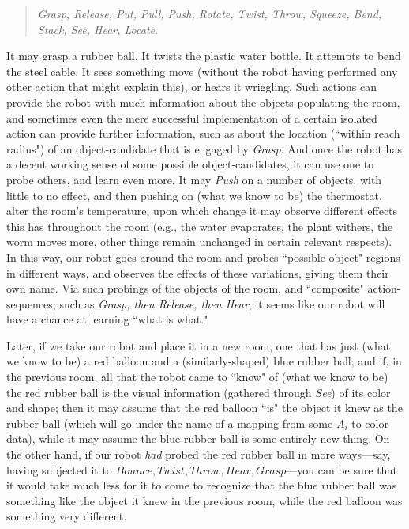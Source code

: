 \documentclass[11pt]{book}
\theoremstyle{definition}
\theoremstyle{definition}
\theoremstyle{definition}
\theoremstyle{theorem}
\theoremstyle{definition}
\begin{document}
\begin{quote}
	\textit{Grasp, Release, Put, Pull, Push, Rotate, Twist, Throw, Squeeze, Bend, Stack, See, Hear, Locate}.   
\end{quote}  
It may grasp a rubber ball. It twists the plastic water bottle. It attempts to bend the steel cable. It sees something move (without the robot having performed any other action that might explain this), or hears it wriggling. Such actions can provide the robot with much information about the objects populating the room, and sometimes even the mere successful implementation of a certain isolated action can provide further information, such as about the location (``within reach radius") of an object-candidate that is engaged by \textit{Grasp}. And once the robot has a decent working sense of some possible object-candidates, it can use one to probe others, and learn even more. It may \textit{Push} on a number of objects, with little to no effect, and then pushing on (what we know to be) the thermostat, alter the room's temperature, upon which change it may observe different effects this has throughout the room (e.g., the water evaporates, the plant withers, the worm moves more, other things remain unchanged in certain relevant respects). In this way, our robot goes around the room and probes ``possible object" regions in different ways, and observes the effects of these variations, giving them their own name. Via such probings of the objects of the room, and ``composite" action-sequences, such as \textit{Grasp, then Release, then Hear}, it seems like our robot will have a chance at learning ``what is what." \par  
Later, if we take our robot and place it in a new room, one that has just (what we know to be) a red balloon and a (similarly-shaped) blue rubber ball; and if, in the previous room, all that the robot came to ``know" of (what we know to be) the red rubber ball is the visual information (gathered through \textit{See}) of its color and shape; then it may assume that the red balloon ``is" the object it knew as the rubber ball (which will go under the name of a mapping from some $A_i$ to color data), while it may assume the blue rubber ball is some entirely new thing. On the other hand, if our robot \textit{had} probed the red rubber ball in more ways---say, having subjected it to $Bounce, Twist, Throw, Hear, Grasp$---you can be sure that it would take much less for it to come to recognize that the blue rubber ball was something like the object it knew in the previous room, while the red balloon was something very different. \par  
\end{document}
